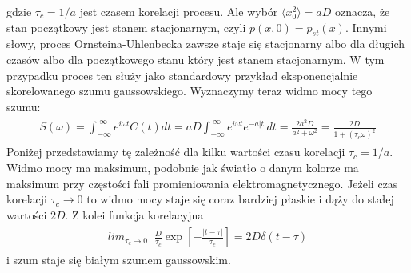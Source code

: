 \documentclass[a4paper,12pt,polish]{sphinxmanual}
\begin{document}
gdzie $\tau_c = 1/a$ jest czasem korelacji procesu. Ale wybór $\langle x_0^2 \rangle = aD$ oznacza, że stan początkowy jest stanem stacjonarnym, czyli $p(x, 0) = p_{st}(x)$. Innymi słowy, proces Ornsteina-Uhlenbecka zawsze staje się stacjonarny albo dla długich czasów albo dla początkowego stanu który jest stanem stacjonarnym. W tym przypadku proces ten służy jako standardowy przykład eksponencjalnie skorelowanego szumu gaussowskiego. Wyznaczymy teraz widmo mocy tego szumu:
\label{ch3/chIII032:equation-eqn16}\begin{gather}
\begin{split}S(\omega) = \int_{-\infty}^{\; \infty} e^{i\omega t} C(t) dt = aD \int_{-\infty}^{\; \infty} e^{i\omega t} e^{-a|t|} dt = \frac{2a^2 D}{a^2 + \omega^2} = \frac{2 D}{1 + (\tau_c \omega)^2}\end{split}\label{ch3/chIII032-eqn16}
\end{gather}
Poniżej przedstawiamy tę zależność dla kilku wartości czasu korelacji $\tau_c = 1/a$. Widmo mocy ma maksimum, podobnie jak światło o danym kolorze ma maksimum przy częstości fali promieniowania elektromagnetycznego. Jeżeli czas korelacji $\tau_c \to 0$ to widmo mocy staje się coraz bardziej płaskie i dąży do stałej wartości $2D$. Z kolei funkcja korelacyjna
\label{ch3/chIII032:equation-eqn17}\begin{gather}
\begin{split} lim_{\tau_c \to 0} \; \; \frac{D}{\tau_c} \exp\left[ -\frac{|t-\tau|}{\tau_c}\right] = 2D \delta(t - \tau)\end{split}\label{ch3/chIII032-eqn17}
\end{gather}
i szum staje się białym szumem gaussowskim.
\end{document}
